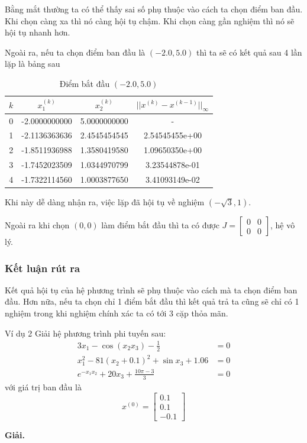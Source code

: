 Bằng mắt thường ta có thể thấy sai số phụ thuộc vào cách ta chọn điểm ban đầu. Khi chọn càng xa thì nó càng hội tụ chậm. Khi chọn càng gần nghiệm thì nó sẽ hội tụ nhanh hơn. 

Ngoài ra, nếu ta chọn điểm ban đầu là $(-2.0,5.0)$ thì ta sẽ có kết quả sau 4 lần lặp là bảng sau

\begin{table}[H]
\centering
\caption{Điểm bắt đầu $(-2.0,5.0)$}
\begin{tabular}{|c|c|c|c|}
\hline
\textbf{$k$} & \textbf{$x_{1}^{(k)}$} & \textbf{$x_{2}^{(k)}$} & \textbf{$||x^{(k)} - x^{(k-1)}||_\infty$} \\
\hline
0 & -2.0000000000 & 5.0000000000 &  - \\
1 &-2.1136363636 & 2.4545454545 &2.54545455e+00 \\
2 &-1.8511936988 & 1.3580419580 &1.09650350e+00 \\
3 &-1.7452023509 & 1.0344970799 &3.23544878e-01 \\
4 & -1.7322114560 & 1.0003877650 &3.41093149e-02 \\
\hline
\end{tabular}
\end{table}

Khi này dễ dàng nhận ra, việc lặp đã hội tụ về nghiệm $(-\sqrt3 ,1)$. 

Ngoài ra khi chọn $(0,0)$ làm điểm bắt đầu thì ta có được $J= \begin{bmatrix}
    0 &0\\0 &0
\end{bmatrix}$, hệ vô lý.

\subsubsection*{Kết luận rút ra}
 Kết quả hội tụ của hệ phương trình sẽ phụ thuộc vào cách mà ta chọn điểm ban đầu. Hơn nữa, nếu ta chọn chỉ 1 điểm bắt đầu thì kết quả trả ta cũng sẽ chỉ có 1 nghiệm trong khi nghiệm chính xác ta có tới 3 cặp thỏa mãn.\\
\begin{bt}{Ví dụ 2}
Giải hệ phương trình phi tuyến sau:
\begin{align*}
    3x_{1} - \cos(x_{2}x_{3}) - \frac{1}{2} &= 0 \\
    x_{1}^{2} - 81(x_{2} + 0.1)^{2} + \sin x_{3} + 1.06 &= 0 \\
    e^{-x_{1}x_{2}} + 20x_{3} + \frac{10\pi - 3}{3} &= 0
\end{align*}
với giá trị ban đầu là
\[
x^{(0)} = \begin{bmatrix} 0.1 \\ 0.1 \\ -0.1 \end{bmatrix}
\]
\end{bt}
\textbf{Giải.}

